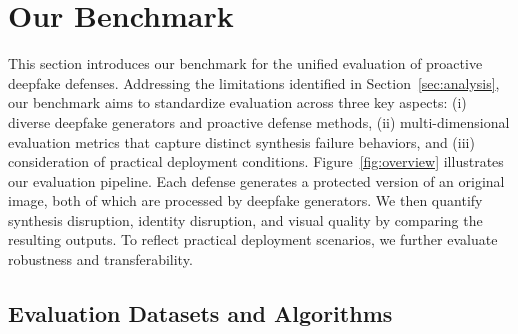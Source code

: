 \documentclass{article}
\begin{document}

\section{Our Benchmark}
\label{sec:benchmark}
This section introduces our benchmark for the unified evaluation of proactive deepfake defenses. Addressing the limitations identified in Section~\ref{sec:analysis}, our benchmark aims to standardize evaluation across three key aspects: (i) diverse deepfake generators and proactive defense methods, (ii) multi-dimensional evaluation metrics that capture distinct synthesis failure behaviors, and (iii) consideration of practical deployment conditions.
Figure~\ref{fig:overview} illustrates our evaluation pipeline. Each defense generates a protected version of an original image, both of which are processed by deepfake generators. We then quantify synthesis disruption, identity disruption, and visual quality by comparing the resulting outputs. To reflect practical deployment scenarios, we further evaluate robustness and transferability.

\subsection{Evaluation Datasets and Algorithms}
\label{sec:data_alg}
\end{document}
